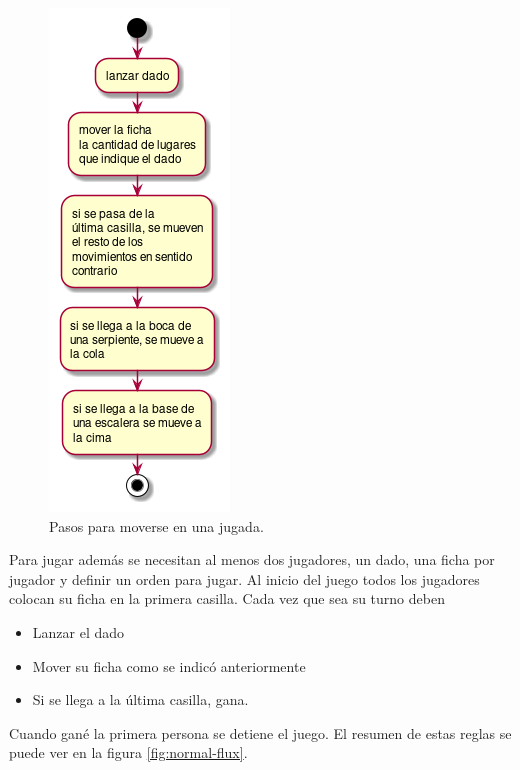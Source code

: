 \documentclass[11pt]{article}
\begin{document}
\begin{figure}[htbp]
\centering
\includegraphics[scale=0.75]{imgs/move_flux.png}
\caption{\label{fig:move-flux}Pasos para moverse en una jugada.}
\end{figure}

Para jugar además se necesitan al menos dos jugadores, un dado, una ficha por
jugador y definir un orden para jugar. Al inicio del juego todos los jugadores
colocan su ficha en la primera casilla. Cada vez que sea su turno deben

\begin{itemize}
\item Lanzar el dado
\item Mover su ficha como se indicó anteriormente
\item Si se llega a la última casilla, gana.
\end{itemize}

Cuando gané la primera persona se detiene el juego. El resumen de estas reglas
se puede ver en la figura \ref{fig:normal-flux}.
\end{document}
